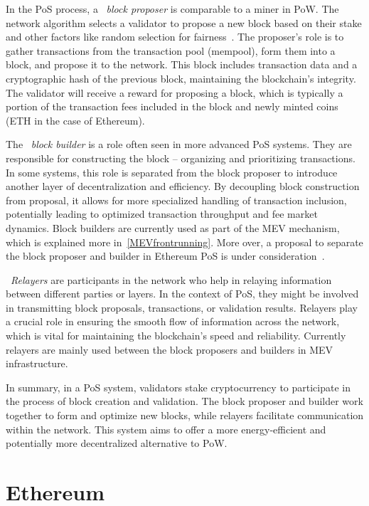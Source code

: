 In the PoS process, a ~\textit{block proposer} is comparable to a miner in PoW. The network algorithm selects a validator to propose a new block based on their stake and other factors like random selection for fairness~\cite{ethereumrandao}. The proposer's role is to gather transactions from the transaction pool (mempool), form them into a block, and propose it to the network. This block includes transaction data and a cryptographic hash of the previous block, maintaining the blockchain's integrity. The validator will receive a reward for proposing a block, which is typically a portion of the transaction fees included in the block and newly minted coins (ETH in the case of Ethereum).

The ~\textit{block builder} is a role often seen in more advanced PoS systems. They are responsible for constructing the block – organizing and prioritizing transactions. In some systems, this role is separated from the block proposer to introduce another layer of decentralization and efficiency. By decoupling block construction from proposal, it allows for more specialized handling of transaction inclusion, potentially leading to optimized transaction throughput and fee market dynamics. Block builders are currently used as part of the MEV mechanism, which is explained more in~\ref{MEVfrontrunning}. More over, a proposal to separate the block proposer and builder in Ethereum PoS is under consideration~\cite{ethereumPBS}.

~\textit{Relayers} are participants in the network who help in relaying information between different parties or layers. In the context of PoS, they might be involved in transmitting block proposals, transactions, or validation results. Relayers play a crucial role in ensuring the smooth flow of information across the network, which is vital for maintaining the blockchain's speed and reliability. Currently relayers are mainly used between the block proposers and builders in MEV infrastructure.

In summary, in a PoS system, validators stake cryptocurrency to participate in the process of block creation and validation. The block proposer and builder work together to form and optimize new blocks, while relayers facilitate communication within the network. This system aims to offer a more energy-efficient and potentially more decentralized alternative to PoW.




\section{Ethereum}

